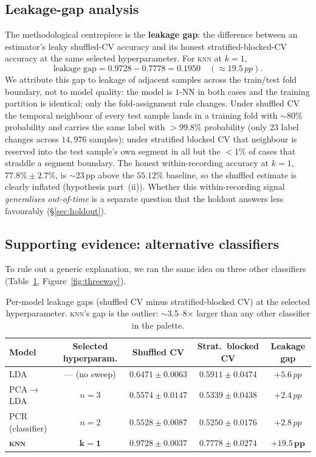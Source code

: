 \documentclass[11pt]{article}
\newcommand{\pp}{\,pp}          %
\newcommand{\knn}{\textsc{knn}}
\begin{document}
\subsection{Leakage-gap analysis}
\label{sec:leakgap}

The methodological centrepiece is the \textbf{leakage gap}: the difference
between an estimator's leaky shuffled-CV accuracy and its honest
stratified-blocked-CV accuracy at the same selected hyperparameter. For
\knn{} at $k=1$,
\[
  \text{leakage gap} = 0.9728 - 0.7778 = 0.1950 \quad (\approx 19.5\pp).
\]
We attribute this gap to leakage of adjacent samples across the train/test
fold boundary, not to model quality: the model is $1$-NN in both cases and
the training partition is identical; only the fold-assignment rule changes.
Under shuffled CV the temporal neighbour of every test sample lands in a
training fold with $\sim$80\% probability and carries the same label with
$>$99.8\% probability (only $23$ label changes across $14{,}976$ samples); under
stratified blocked CV that neighbour is reserved into the test sample's own
segment in all but the $<$1\% of cases that straddle a segment boundary. The
honest within-recording accuracy at $k=1$, $77.8\% \pm 2.7\%$, is
$\sim$23\pp{} above the $55.12\%$ baseline, so the shuffled estimate is
clearly inflated (hypothesis part~(ii)). Whether this within-recording
signal \emph{generalises out-of-time} is a separate question that the
holdout answers less favourably (\S\ref{sec:holdout}).

\subsection{Supporting evidence: alternative classifiers}

To rule out a generic explanation, we ran the same idea on three other
classifiers (Table~\ref{tab:gaps}, Figure~\ref{fig:threeway}).

\begin{table}[t]
  \centering
  \caption{Per-model leakage gaps (shuffled CV minus stratified-blocked CV)
  at the selected hyperparameter. \knn{}'s gap is the outlier:
  $\sim$3.5--8$\times$ larger than any other classifier in the palette.}
  \label{tab:gaps}
  \setlength{\tabcolsep}{4pt}
  \small
  \begin{tabular}{lcccc}
    \toprule
    Model & Selected hyperparam. & Shuffled CV & Strat.\ blocked CV & Leakage gap \\
    \midrule
    LDA            & --- (no sweep) & $0.6471 \pm 0.0063$ & $0.5911 \pm 0.0474$ & $+5.6\pp$ \\
    PCA$\to$LDA    & $n=3$          & $0.5574 \pm 0.0147$ & $0.5339 \pm 0.0438$ & $+2.4\pp$ \\
    PCR (classifier)& $n=2$         & $0.5528 \pm 0.0087$ & $0.5250 \pm 0.0176$ & $+2.8\pp$ \\
    \textbf{\knn{}} & $\mathbf{k=1}$ & $\mathbf{0.9728 \pm 0.0037}$ & $\mathbf{0.7778 \pm 0.0274}$ & $\mathbf{+19.5\pp}$ \\
    \bottomrule
  \end{tabular}
\end{table}
\end{document}

